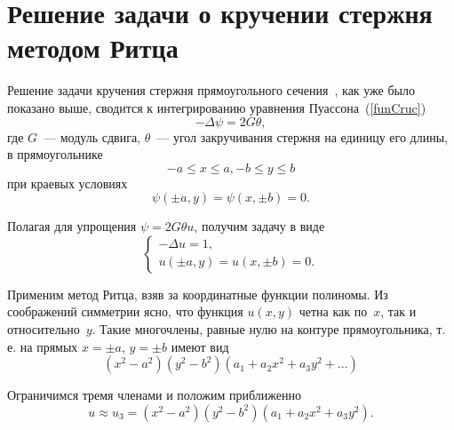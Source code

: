 \documentclass[12pt, a4paper]{article}
\begin{document}
\section{Решение задачи о кручении стержня методом Ритца}
Решение задачи кручения стержня прямоугольного сечения~\cite{Michilin}, как уже было показано выше,  сводится к интегрированию уравнения Пуассона~(\ref{funCruc})
 \[
-\Delta \psi = 2G \theta,
\]
где $G$~--- модуль сдвига, $\theta$~--- угол закручивания стержня на единицу
его длины, в прямоугольнике
\[
-a \leqslant x \leqslant a, -b \leqslant y \leqslant b
\]
при краевых условиях
\[
\psi(\pm a, y) =  \psi(x,\pm b) = 0.
\]

Полагая для упрощения $\psi = 2G \theta u$, получим задачу в виде
\[
	\begin{cases}
	-\Delta u = 1, \\
	u(\pm a, y) =  u(x,\pm b) = 0.
	\end{cases}
\]

Применим метод Ритца, взяв за координатные функции полиномы.
Из соображений симметрии ясно, что функция $u(x, y)$ четна
как по~$x$, так и относительно~$y$. Такие многочлены, равные нулю на контуре прямоугольника, т.\,е. на прямых $x = \pm a$, $y = \pm b$ имеют вид
\[
	(x^2 - a^2)(y^2 - b^2)(a_1 + a_2x^2 + a_3 y^2 + \ldots)
\]

Ограничимся тремя членами и положим приближенно
\begin{equation}\label{u_3_poly_Ritz}
	u \approx u_3 = (x^2 - a^2)(y^2 - b^2)(a_1 + a_2 x^2 + a_3 y^2).
\end{equation}
\end{document}
